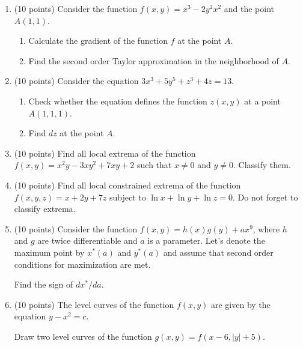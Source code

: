 \documentclass[12pt]{article} %
\theoremstyle{definition} %
\begin{document}
\begin{enumerate}

\item (10 points) Consider the function $f(x, y) = x^3 -2y^2 x^2$ and the point $A(1,1)$.
\begin{enumerate}
  \item Calculate the gradient of the function $f$ at the point $A$.
  \item Find the second order Taylor approximation in the neighborhood of $A$.
\end{enumerate}

\item (10 points) Consider the equation $3x^3 + 5y^5 + z^3 + 4z=13$. 
\begin{enumerate}
  \item Check whether the equation defines the function $z(x, y)$ at a point $A(1,1,1)$.
  \item Find $dz$ at the point $A$.
\end{enumerate}


\item (10 points) Find all local extrema of the function $f(x, y) = x^2 y - 3xy^2 + 7xy +2$ such that $x\neq 0$ and $y\neq 0$. 
Classify them.

\item (10 points) Find all local constrained extrema 
of the function $f(x, y, z) = x + 2y + 7z$ subject to $\ln x + \ln y + \ln z = 0$.
Do not forget to classify extrema. 

\item (10 points) Consider the function $f(x, y) = h(x) g(y) + ax^9$, where $h$ and $g$ are twice differentiable
and $a$ is a parameter. Let's denote the maximum point by $x^*(a)$ and $y^*(a)$ and assume that second order conditions for maximization are met.

Find the sign of $dx^*/da$. 

\item (10 points) The level curves of the function $f(x,y)$ are given by the equation $y - x^2 = c$.

Draw two level curves of the function $g(x,y)=f(x-6, |y| + 5)$.

\end{enumerate}



\newpage
{}
\end{document}
